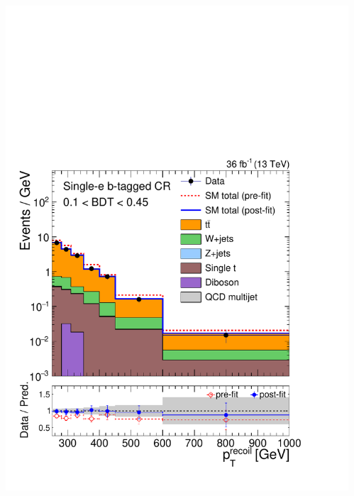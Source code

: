 \documentclass[aspectratio=169,xcolor=dvipsnames,,table,compress]{beamer}
\begin{document}
\begin{frame}[t]
\begin{columns}[T]
\begin{column}{0.125\textwidth}
      \includegraphics[width=\textwidth]{../figures/monotop/postfit/stackedPostfit_singleelectrontop_monotop_loose.pdf}
    \end{column}
    \begin{column}{0.125\textwidth}

\end{column}
\end{columns}
\end{frame}
\end{document}
